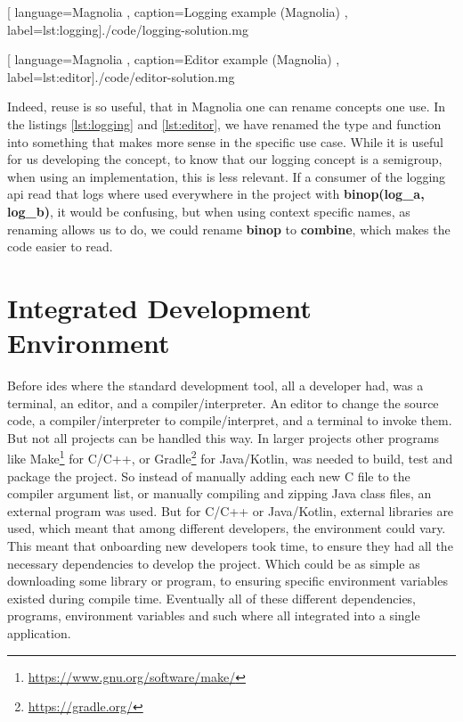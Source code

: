 \begin{center}
  
    [ language=Magnolia
    , caption={Logging example (Magnolia)}
    , label=lst:logging]{./code/logging-solution.mg}
\end{center}

\begin{center}
  
    [ language=Magnolia
    , caption={Editor example (Magnolia)}
    , label=lst:editor]{./code/editor-solution.mg}
\end{center}

Indeed, reuse is so useful, that in Magnolia one can rename concepts one use.
In the listings \ref{lst:logging} and \ref{lst:editor}, we have renamed the type
and function into something that makes more sense in the specific use case.
While it is useful for us developing the concept, to know that our logging
concept is a semigroup, when using an implementation, this is less relevant.
If a consumer of the logging \gls*{api} read that logs where used everywhere in
the project with \textbf{binop(log\_a, log\_b)}, it would be confusing, but when
using context specific names, as renaming allows us to do, we could rename
\textbf{binop} to \textbf{combine}, which makes the code easier to read.

\section{Integrated Development Environment} \label{sec:ide}

Before \gls*{ide}s where the standard development tool, all a developer had, was
a terminal, an editor, and a compiler/interpreter. An editor to change the
source code, a compiler/interpreter to compile/interpret, and a terminal to
invoke them. But not all projects can be handled this way. In larger projects
other programs like
Make\footnote{\url{https://www.gnu.org/software/make/}} for C/C++, or
Gradle\footnote{\url{https://gradle.org/}} for Java/Kotlin, was needed to
build, test and package the project. So instead of manually adding each new C
file to the compiler argument list, or manually compiling and zipping Java class
files, an external program was used. But for C/C++ or Java/Kotlin, external
libraries are used, which meant that among different developers, the environment
could vary. This meant that onboarding new developers took time, to ensure they
had all the necessary dependencies to develop the project. Which could be as
simple as downloading some library or program, to ensuring specific environment
variables existed during compile time. Eventually all of these different
dependencies, programs, environment variables and such where all integrated into
a single application.

